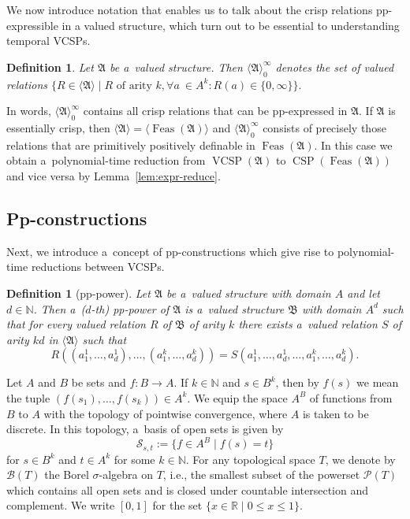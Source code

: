 \documentclass[preprint,12pt]{elsarticle}
\newcommand{\N}{\mathbb N}
\newcommand{\bA}{{\mathfrak A}}
\newcommand{\bB}{{\mathfrak B}}
\newcommand{\checked}[1]{#1}
\DeclareMathOperator{\VCSP}{VCSP}
\DeclareMathOperator{\CSP}{CSP}
\DeclareMathOperator{\Feas}{Feas}
\newtheorem{definition}[theorem]{Definition}
\begin{document}
We now introduce notation that enables us to talk about the crisp relations \checked{pp-}expressible in a valued structure, which turn out to be essential to understanding temporal VCSPs.
%
\begin{definition}
Let $\bA$ be a~valued structure. Then $\langle \bA \rangle_0^\infty$ denotes the set of valued relations 
$\{R \in \langle \bA \rangle \mid R  \text{ of arity }k, \forall a~\in A^k \colon R(a) \in \{0,\infty\} \}.$
\end{definition}
In words, $\langle \bA \rangle_0^\infty$ contains all crisp relations that can be \checked{pp-}expressed in $\bA$.
%
If $\bA$ is essentially crisp, then 
$\langle \bA \rangle = \langle \Feas(\bA) \rangle$
and $\langle \bA \rangle_0^\infty$
consists of precisely those relations that are primitively positively definable in $\Feas(\bA)$. In this case we obtain a~polynomial-time reduction from $\VCSP(\bA)$ to $\CSP(\Feas(\bA))$ and vice versa by Lemma~\ref{lem:expr-reduce}.

\subsection{Pp-constructions}
Next, we introduce a~concept of pp-constructions which give rise to poly\-no\-mial-time reductions between VCSPs. 

\begin{definition}[pp-power]
Let $\bA$ be a~valued structure with domain $A$ and let $d \in {\mathbb N}$. Then a~($d$-th) \emph{pp-power}
of $\bA$ is a~valued structure $\bB$ with domain 
$A^d$ such that for every valued relation $R$ of $\bB$ of arity $k$ there exists a~valued relation $S$ of arity $kd$ in $\langle \bA \rangle$ such that 
\[R((a^1_1,\dots,a^1_d),\dots,(a^k_1,\dots,a^k_d)) = S(a^1_1,\dots,a^1_d,\dots,a^k_1,\dots,a^k_d).\]
\end{definition}

Let $A$ and $B$ be sets and $f: B \to A$. If $k \in \N$ and $s \in B^k$, then by $f(s)$ we mean the tuple $(f(s_1), \dots, f(s_k)) \in A^k.$
We equip the space $A^B$ of functions from $B$ to $A$ with the topology of pointwise convergence, where $A$ is taken to be discrete. 
In this topology, a~basis of open sets is given by
\[{\mathscr S}_{s,t} := \{f \in A^B \mid f(s)=t\}\]
for $s \in B^k$ and $t \in A^k$ for some $k \in {\mathbb N}$.
For any topological space $T$, we denote by $\mathcal{B}(T)$
the Borel $\sigma$-algebra on $T$, i.e., the smallest subset of the powerset ${\mathcal P}(T)$ which contains all open sets and is closed under countable intersection and complement. We write $[0,1]$ for the set $\{x \in {\mathbb R} \mid 0 \leq x \leq 1\}$.
\end{document}
